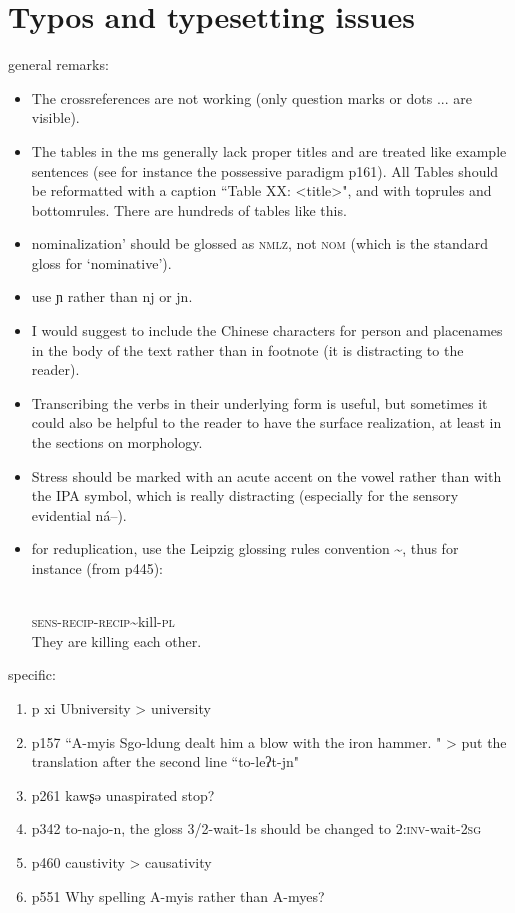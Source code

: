 \documentclass[oldfontcommands,oneside,a4paper,11pt]{article}
\newcommand{\ipa}[1]{{\phon \mbox{#1}}} %
\begin{document}
 
 
\section{Typos and typesetting issues}
general remarks:
\begin{itemize}
\item The crossreferences are not working (only question marks or dots ... are visible).
\item The tables in the ms generally lack proper titles and are treated like example sentences (see for instance the possessive paradigm p161). All Tables should be reformatted with a caption ``Table XX: <title>", and with toprules and bottomrules. There are hundreds of tables like this.
\item  nominalization' should be glossed as \textsc{nmlz}, not \textsc{nom} (which is the standard gloss for `nominative').

\item use \ipa{ɲ} rather than \ipa{nj} or \ipa{jn}.
\item I would suggest to include the Chinese characters for person and placenames in the body of the text rather than in footnote (it is distracting to the reader).
 \item Transcribing the verbs in their underlying form is useful, but sometimes it could also be helpful to the reader to have the surface realization, at least in the sections on morphology.
 \item Stress should be marked with an acute accent on the vowel rather than with the IPA symbol, which is really distracting (especially for the sensory evidential \ipa{ná--}).
 \item for reduplication, use the Leipzig glossing rules convention \textasciitilde{}, thus for instance (from p445):
\begin{exe}
\ex  
\gll \ipa{ná-ŋa-sa\textasciitilde{}sat-ɲ} \\
\textsc{sens-recip}-\textsc{recip}\textasciitilde{}kill-\textsc{pl} \\
\glt  They are killing each other. 
\end{exe} 
\end{itemize} 
 specific:
\begin{enumerate}
\item p xi Ubniversity > university
\item  p157 ``A-myis Sgo-ldung dealt him a blow with the iron hammer. " > put the translation after the second line ``to-leʔt-jn"
\item p261 \ipa{kawʂə} unaspirated stop?
\item p342 \ipa{to-najo-n}, the gloss 3/2-wait-1s should be changed to  \textsc{2:inv}-wait-\textsc{2sg}
\item p460 caustivity > causativity
\item p551 Why spelling A-myis rather  than A-myes?
\end{enumerate}  
  
  


\end{document}
